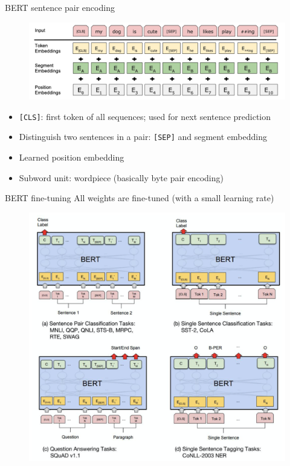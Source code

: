 \documentclass[usenames,dvipsnames,11pt,aspectratio=169]{beamer}
\begin{document}
\begin{frame}
    {BERT sentence pair encoding}
    \begin{figure}
            \includegraphics[width=.9\textwidth]{figures/bert}
    \end{figure}
    \begin{itemize}
        \item \texttt{[CLS]}: first token of all sequences; used for next sentence prediction
        \item Distinguish two sentences in a pair: \texttt{[SEP]} and segment embedding
        \item Learned position embedding
        \item Subword unit: wordpiece (basically byte pair encoding) 
    \end{itemize}
\end{frame}

\begin{frame}
    {BERT fine-tuning}
    All weights are fine-tuned (with a small learning rate)
    \vspace{-1.5em}
    \begin{figure}
            \includegraphics[height=0.9\textheight]{figures/bert-finetuning}
    \end{figure}
\end{frame}
\end{document}
